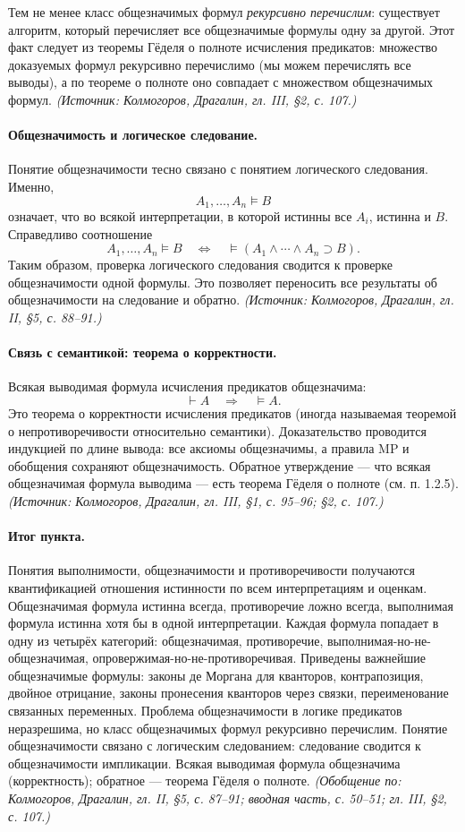 \documentclass[a4paper,12pt]{article}
\begin{document}
Тем не менее класс общезначимых формул \emph{рекурсивно перечислим}: существует алгоритм, который перечисляет все общезначимые формулы одну за другой. Этот факт следует из теоремы Гёделя о полноте исчисления предикатов: множество доказуемых формул рекурсивно перечислимо (мы можем перечислять все выводы), а по теореме о полноте оно совпадает с множеством общезначимых формул.
\textit{(Источник: Колмогоров, Драгалин, гл. III, §2, с. 107.)}

\paragraph{Общезначимость и логическое следование.} Понятие общезначимости тесно связано с понятием логического следования. Именно,
\[
A_1,\ldots,A_n\models B
\]
означает, что во всякой интерпретации, в которой истинны все \(A_i\), истинна и \(B\). Справедливо соотношение
\[
A_1,\ldots,A_n\models B\quad\Longleftrightarrow\quad\models(A_1\wedge\cdots\wedge A_n\supset B).
\]
Таким образом, проверка логического следования сводится к проверке общезначимости одной формулы. Это позволяет переносить все результаты об общезначимости на следование и обратно.
\textit{(Источник: Колмогоров, Драгалин, гл. II, §5, с. 88--91.)}

\paragraph{Связь с семантикой: теорема о корректности.} Всякая выводимая формула исчисления предикатов общезначима:
\[
\vdash A\quad\Longrightarrow\quad\models A.
\]
Это теорема о корректности исчисления предикатов (иногда называемая теоремой о непротиворечивости относительно семантики). Доказательство проводится индукцией по длине вывода: все аксиомы общезначимы, а правила MP и обобщения сохраняют общезначимость. Обратное утверждение --- что всякая общезначимая формула выводима --- есть теорема Гёделя о полноте (см. п. 1.2.5).
\textit{(Источник: Колмогоров, Драгалин, гл. III, §1, с. 95--96; §2, с. 107.)}

\paragraph{Итог пункта.} Понятия выполнимости, общезначимости и противоречивости получаются квантификацией отношения истинности по всем интерпретациям и оценкам. Общезначимая формула истинна всегда, противоречие ложно всегда, выполнимая формула истинна хотя бы в одной интерпретации. Каждая формула попадает в одну из четырёх категорий: общезначимая, противоречие, выполнимая-но-не-общезначимая, опровержимая-но-не-противоречивая. Приведены важнейшие общезначимые формулы: законы де Моргана для кванторов, контрапозиция, двойное отрицание, законы пронесения кванторов через связки, переименование связанных переменных. Проблема общезначимости в логике предикатов неразрешима, но класс общезначимых формул рекурсивно перечислим. Понятие общезначимости связано с логическим следованием: следование сводится к общезначимости импликации. Всякая выводимая формула общезначима (корректность); обратное --- теорема Гёделя о полноте.
\textit{(Обобщение по: Колмогоров, Драгалин, гл. II, §5, с. 87--91; вводная часть, с. 50--51; гл. III, §2, с. 107.)}
\end{document}
